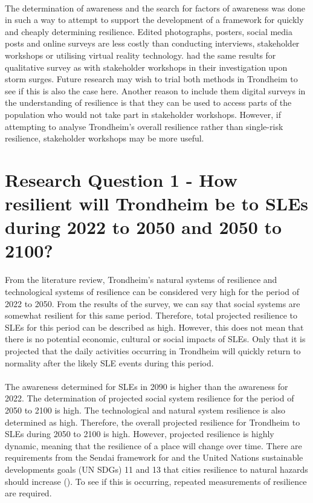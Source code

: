 \paragraph{}
The determination of awareness and the search for factors of awareness was done in such a way to attempt to support the development of a framework for quickly and cheaply determining resilience. Edited photographs, posters, social media posts and online surveys are less costly than conducting interviews, stakeholder workshops or utilising virtual reality technology. \cite{gerkensmeier_governing_2018} had the same results for qualitative survey as with stakeholder workshops in their investigation upon storm surges. Future research may wish to trial both methods in Trondheim to see if this is also the case here. Another reason to include them digital surveys in the understanding of resilience is that they can be used to access parts of the population who would not take part in stakeholder workshops. However, if attempting to analyse Trondheim's overall resilience rather than single-risk resilience, stakeholder workshops may be more useful.


\section{Research Question 1 - How resilient will Trondheim be to SLEs during 2022 to 2050 and 2050 to 2100? }
From the literature review, Trondheim's natural systems of resilience and technological systems of resilience can be considered very high for the period of 2022 to 2050. From the results of the survey,  we can say that social systems are somewhat resilient for this same period. Therefore, total projected resilience to SLEs for this period can be described as high. However, this does not mean that there is no potential economic, cultural or social impacts of SLEs. Only that it is projected that the daily activities occurring in Trondheim will quickly return to normality after the likely SLE events during this period.
\paragraph{}
The awareness determined for SLEs in 2090 is higher than the awareness for 2022. The determination of projected social system resilience for the period of 2050 to 2100 is high. The technological and natural system resilience is also determined as high. Therefore, the overall projected resilience for Trondheim to SLEs during 2050 to 2100 is high. However, projected resilience is highly dynamic, meaning that the resilience of a place will change over time. There are requirements from the Sendai framework for and the United Nations sustainable developments goals (UN SDGs) 11 and 13 that cities resilience to natural hazards should increase (\cite{gonzalez-riancho_storm_2017}). To see if this is occurring, repeated measurements of resilience are required. 

